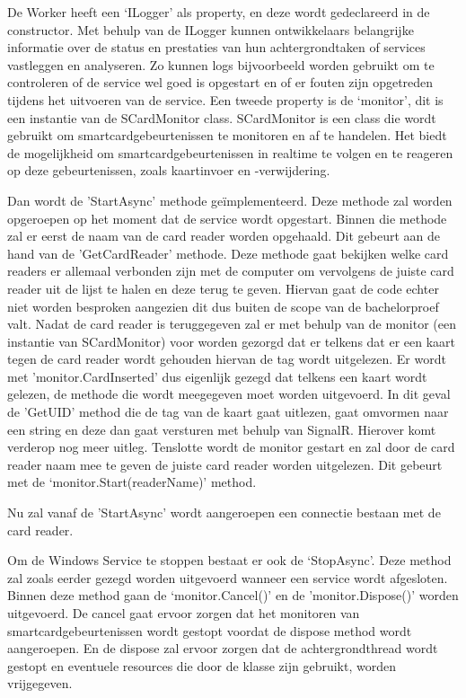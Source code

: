 De Worker heeft een ‘ILogger’ als property, en deze wordt gedeclareerd in de constructor. Met behulp van de ILogger kunnen ontwikkelaars belangrijke informatie over de status en prestaties van hun achtergrondtaken of services vastleggen en analyseren. Zo kunnen logs bijvoorbeeld worden gebruikt om te controleren of de service wel goed is opgestart en of er fouten zijn opgetreden tijdens het uitvoeren van de service. Een tweede property is de ‘monitor’, dit is een instantie van de SCardMonitor class.  SCardMonitor is een class die wordt gebruikt om smartcardgebeurtenissen te monitoren en af te handelen. Het biedt de mogelijkheid om smartcardgebeurtenissen in realtime te volgen en te reageren op deze gebeurtenissen, zoals kaartinvoer en -verwijdering.

Dan wordt de 'StartAsync’ methode geïmplementeerd. Deze methode zal worden opgeroepen op het moment dat de service wordt opgestart. Binnen die methode zal er eerst de naam van de card reader worden opgehaald. Dit gebeurt aan de hand van de 'GetCardReader’ methode. Deze methode gaat bekijken welke card readers er allemaal verbonden zijn met de computer om vervolgens de juiste card reader uit de lijst te halen en deze terug te geven. Hiervan gaat de code echter niet worden besproken aangezien dit dus buiten de scope van de bachelorproef valt. Nadat de card reader is teruggegeven zal er met behulp van de monitor (een instantie van SCardMonitor) voor worden gezorgd dat er telkens dat er een kaart tegen de card reader wordt gehouden hiervan de tag wordt uitgelezen. Er wordt met 'monitor.CardInserted’ dus eigenlijk gezegd dat telkens een kaart wordt gelezen, de methode die wordt meegegeven moet worden uitgevoerd. In dit geval de 'GetUID’ method die de tag van de kaart gaat uitlezen, gaat omvormen naar een string en deze dan gaat versturen met behulp van SignalR. Hierover komt verderop nog meer uitleg. Tenslotte wordt de monitor gestart en zal door de card reader naam mee te geven de juiste card reader worden uitgelezen. Dit gebeurt met de ‘monitor.Start(readerName)’ method. 

Nu zal vanaf de 'StartAsync’ wordt aangeroepen een connectie bestaan met de card reader. 

Om de Windows Service te stoppen bestaat er ook de ‘StopAsync’. Deze method zal zoals eerder gezegd worden uitgevoerd wanneer een service wordt afgesloten. Binnen deze method gaan de ‘monitor.Cancel()’ en de 'monitor.Dispose()’ worden uitgevoerd. De cancel gaat ervoor zorgen dat het monitoren van smartcardgebeurtenissen wordt gestopt voordat de dispose method wordt aangeroepen. En de dispose zal ervoor zorgen dat de achtergrondthread wordt gestopt en eventuele resources die door de klasse zijn gebruikt, worden vrijgegeven. 

